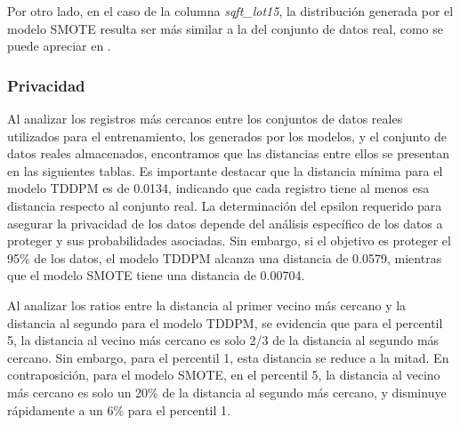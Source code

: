 

\newpage
Por otro lado, en el caso de la columna \emph{sqft\_lot15}, la distribución generada por el modelo SMOTE resulta ser más similar a la del conjunto de datos real, como se puede apreciar en .




\newpage
\subsubsection{Privacidad}
Al analizar los registros más cercanos entre los conjuntos de datos reales utilizados para el entrenamiento, los generados por los modelos, y el conjunto de datos reales almacenados, encontramos que las distancias entre ellos se presentan en las siguientes tablas. Es importante destacar que la distancia mínima para el modelo TDDPM es de 0.0134, indicando que cada registro tiene al menos esa distancia respecto al conjunto real. La determinación del epsilon requerido para asegurar la privacidad de los datos depende del análisis específico de los datos a proteger y sus probabilidades asociadas. Sin embargo, si el objetivo es proteger el 95\% de los datos, el modelo TDDPM alcanza una distancia de 0.0579, mientras que el modelo SMOTE tiene una distancia de 0.00704.





\newpage
Al analizar los ratios entre la distancia al primer vecino más cercano y la distancia al segundo para el modelo TDDPM, se evidencia que para el percentil 5, la distancia al vecino más cercano es solo 2/3 de la distancia al segundo más cercano. Sin embargo, para el percentil 1, esta distancia se reduce a la mitad. En contraposición, para el modelo SMOTE, en el percentil 5, la distancia al vecino más cercano es solo un 20\% de la distancia al segundo más cercano, y disminuye rápidamente a un 6\% para el percentil 1.




\newpage
%
%
%


